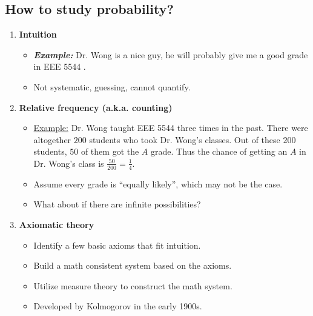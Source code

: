 \subsection{How to study probability?}
\begin{enumerate}
\item \textbf{Intuition}
\begin{itemize}
\item \emph{\bf{Example:} } Dr. Wong is a nice guy, he will probably give me a good grade in EEE 5544 .
\item Not systematic, guessing, cannot quantify.
\end{itemize}

\item \textbf{Relative frequency (a.k.a. counting)} 
\begin{itemize}
\item \underline{Example:} Dr. Wong taught EEE 5544 three times in the
  past. There were altogether $200$ students who took Dr. Wong's
  classes. Out of these $200$ students, $50$ of them got the \(A\) grade.
  Thus the chance of getting an \(A\) in Dr. Wong's class is
  \(\frac{50}{200}=\frac{1}{4}\).
\item Assume every grade is ``equally likely'', which may not be the case.
\item What about if there are infinite possibilities?
\end{itemize}

\item \textbf{Axiomatic theory} 
\begin{itemize}
  \item Identify a few basic axioms that fit intuition.
  \item Build a math consistent system based on the axioms.
  \item Utilize measure theory to construct the math system.
  \item Developed by Kolmogorov in the early 1900s.
\end{itemize}
\end{enumerate}

